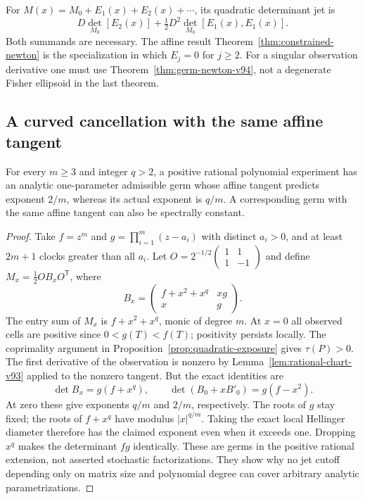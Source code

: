 For $M(x)=M_0+E_1(x)+E_2(x)+\cdots$, its quadratic determinant
jet is
\[
 D\det_{M_0}[E_2(x)]
       +\tfrac12D^2\det_{M_0}[E_1(x),E_1(x)].
\]
Both summands are necessary. The affine result
Theorem~\ref{thm:constrained-newton} is the specialization in which
$E_j=0$ for $j\ge2$. For a singular observation derivative one must
use Theorem~\ref{thm:germ-newton-v94}, not a degenerate Fisher
ellipsoid in the last theorem.

\subsection{A curved cancellation with the same affine tangent}
\begin{proposition}
\label{prop:curved-cancellation-v94}
For every $m\ge3$ and integer $q>2$, a positive rational polynomial
experiment has an analytic one-parameter admissible germ whose
affine tangent predicts exponent $2/m$, whereas its actual exponent
is $q/m$. A corresponding germ with the same affine tangent can
also be spectrally constant.
\end{proposition}
\begin{proof}
Take $f=z^m$ and $g=\prod_{i=1}^m(z-a_i)$ with distinct $a_i>0$,
and at least $2m+1$ clocks greater than all $a_i$. Let
$O=2^{-1/2}\left(\begin{smallmatrix}1&1\\1&-1\end{smallmatrix}\right)$
and define $M_x=\tfrac12OB_xO^{\mathsf T}$, where
\[
 B_x=\begin{pmatrix}f+x^2+x^q&xg\\x&g\end{pmatrix}.
\]
The entry sum of $M_x$ is $f+x^2+x^q$, monic of degree $m$.
At $x=0$ all observed cells are positive since $0<g(T)<f(T)$;
positivity persists locally. The coprimality argument in
Proposition~\ref{prop:quadratic-exposure} gives $\tau(P)>0$.
The first derivative of the observation is nonzero by
Lemma~\ref{lem:rational-chart-v93} applied to the nonzero tangent.
But the exact identities are
\[
 \det B_x=g(f+x^q),\qquad
 \det(B_0+xB'_0)=g(f-x^2).
\]
At zero these give exponents $q/m$ and $2/m$, respectively.
The roots of $g$ stay fixed; the roots of $f+x^q$ have modulus
$|x|^{q/m}$. Taking the exact local Hellinger diameter therefore
has the claimed exponent even when it exceeds one. Dropping $x^q$
makes the determinant $fg$ identically. These are germs in the
positive rational extension, not asserted stochastic factorizations.
They show why no jet cutoff depending only on matrix size and
polynomial degree can cover arbitrary analytic parametrizations.
\end{proof}

